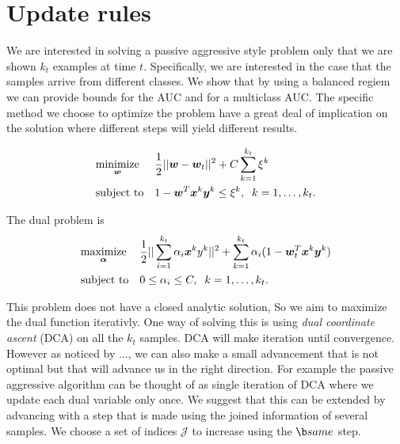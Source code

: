 \section{Update rules}

We are interested in solving a passive aggressive style problem only that we are shown $k_t$ examples at time $t$. Specifically, we are interested in the case that the samples arrive from different classes. We show that by using a balanced regiem we can provide bounds for the AUC and for a multiclass AUC. The specific method we choose to optimize the problem have a great deal of implication on the solution where different steps will yield different results.

\begin{equation*}
\begin{aligned}
& \underset{\bm{w}}{\text{minimize}}
& & \frac{1}{2} || \bm{w} - \bm{w}_t ||^2 + C \sum\limits_{k=1}^{k_t}{\xi^k} \\
& \text{subject to}
& & 1 - \bm{w}^T \bm{x}^k \bm{y}^k \leq \xi^k, \;
 \; k = 1, \ldots, k_t.
\end{aligned}
\end{equation*}


The dual problem is 
\begin{equation*}
\begin{aligned}
& \underset{\bm{\alpha}}{\text{maximize}}
& & \frac{1}{2} || \sum\limits_{i=1}^{k_t} {\alpha_i \bm{x}^k y^k}||^2 + \sum\limits_{k=1}^{k_t} {\alpha_i (1 - \bm{w}_t^T \bm{x}^k \bm{y}^k }) \\
& \text{subject to}
& & 0 \leq \alpha_i \leq C, \;
 \; k = 1, \ldots, k_t.
\end{aligned}
\end{equation*}


This problem does not have a closed analytic solution, So we aim to maximize the dual function iterativly. One way of solving this is using \textit{dual coordinate ascent} (DCA) on all the $k_t$ samples. DCA will make iteration until convergence. However as noticed by ...,  we can also make a small advancement that is not optimal but that will advance us in the right direction. For example the passive aggressive algorithm can be thought of as single iteration of DCA where we update each dual variable only once. We suggest that this can be extended by advancing with a step that is made using the joined information of several samples. We choose a set of indices $\mathcal{J} $ to increase using the ${\b same }$ step.

